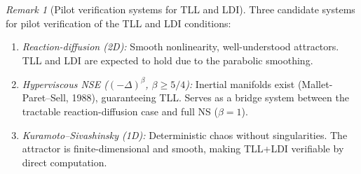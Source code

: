 \documentclass[12pt,a4paper]{article}
\theoremstyle{definition}
\theoremstyle{plain}
\theoremstyle{remark}
\newtheorem{remark}[definition]{Remark}
\begin{document}
\begin{remark}[Pilot verification systems for TLL and LDI]
\label{rem:pilot-verification}
Three candidate systems for pilot verification of the TLL and LDI conditions:
\begin{enumerate}
\item \emph{Reaction-diffusion (2D):} Smooth nonlinearity, well-understood attractors. TLL and LDI are expected to hold due to the parabolic smoothing.
\item \emph{Hyperviscous NSE ($(-\Delta)^\beta$, $\beta \geq 5/4$):} Inertial manifolds exist (Mallet-Paret--Sell, 1988), guaranteeing TLL. Serves as a bridge system between the tractable reaction-diffusion case and full NS ($\beta = 1$).
\item \emph{Kuramoto--Sivashinsky (1D):} Deterministic chaos without singularities. The attractor is finite-dimensional and smooth, making TLL+LDI verifiable by direct computation.
\end{enumerate}
\end{remark}
\end{document}
